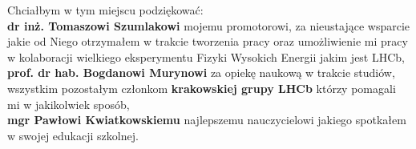 \noindent Chciałbym w tym miejscu podziękować:\\
\textbf{dr inż. Tomaszowi Szumlakowi} mojemu promotorowi, za nieustające wsparcie jakie od Niego otrzymałem w trakcie tworzenia pracy oraz umożliwienie mi pracy w kolaboracji wielkiego eksperymentu Fizyki Wysokich Energii jakim jest LHCb,\\
\textbf{prof. dr hab. Bogdanowi Murynowi} za opiekę naukową w trakcie studiów,\\
wszystkim pozostałym członkom \textbf{krakowskiej grupy LHCb} którzy pomagali mi w jakikolwiek sposób, \\
\textbf{mgr Pawłowi Kwiatkowskiemu} najlepszemu nauczycielowi jakiego spotkałem w swojej edukacji szkolnej.
